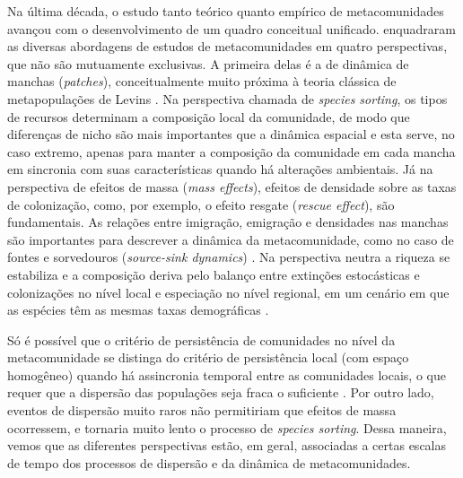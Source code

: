 \documentclass[12pt]{extarticle}
\begin{document}
Na última década, o estudo tanto teórico quanto empírico de metacomunidades
\citep{logue2011} avançou com o desenvolvimento de um
quadro conceitual unificado.  \citet{leibold2004} enquadraram as diversas
abordagens de estudos de metacomunidades em quatro perspectivas, que não são
mutuamente exclusivas. A primeira delas é a de dinâmica de manchas
(\emph{patches}), conceitualmente muito próxima à teoria clássica de
metapopulações de Levins \citep{levins1969,levins1971}. 
Na perspectiva chamada de %
\emph{species sorting}, os tipos de recursos determinam a composição local da comunidade,
de modo que diferenças de nicho são mais importantes que a dinâmica espacial
e esta serve, no caso extremo, apenas para manter a composição da comunidade em
cada mancha em sincronia com suas características quando há alterações ambientais. 
Já na perspectiva de efeitos de massa
(\emph{mass effects}), efeitos de densidade sobre as taxas de colonização, como, por exemplo, o efeito
resgate (\emph{rescue effect}), são fundamentais. As relações entre imigração, emigração e densidades nas manchas
são importantes para descrever a dinâmica da metacomunidade, como no caso de
fontes e sorvedouros (\emph{source-sink dynamics}) \citep{mouquet2002,amarasekare2001}.
Na perspectiva neutra a riqueza se estabiliza e a composição deriva 
pelo  balanço entre extinções estocásticas e colonizações no nível local 
e especiação no nível regional, em um cenário em que as espécies têm as mesmas
taxas demográficas \citep{hubbell2001}.

Só é possível que o critério de persistência de comunidades no nível da
metacomunidade se distinga do critério de persistência local (com espaço
homogêneo) quando há assincronia temporal entre as comunidades locais, o que
requer que a dispersão das populações seja fraca o suficiente
\citep{chesson1981,amarasekare2003}.
Por outro lado, eventos
de dispersão muito raros não permitiriam que efeitos de massa ocorressem, e
tornaria muito lento o processo de \emph{species sorting}. Dessa maneira,
vemos que as diferentes perspectivas estão, em geral, associadas a certas
escalas de tempo dos processos de dispersão e da dinâmica de metacomunidades.
\end{document}
